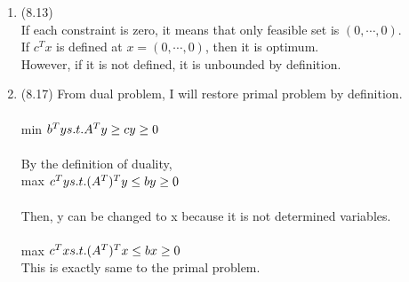 \documentclass[letterpaper,12pt]{article}
\theoremstyle{definition}
\begin{document}
\begin{enumerate}
	\item (8.13) \\
If each constraint is zero, it means that only feasible set is $(0, \cdots, 0)$.\\
If $c^Tx$ is defined at $x = (0, \cdots, 0)$, then it is optimum.\\
However, if it is not defined, it is unbounded by definition.


	\item (8.17) From dual problem, I will restore primal problem by definition.\\ \\
min $ b^Ty\\
s.t. A^Ty \geq c\\
y \geq 0$
\\ \\
By the definition of duality,\\
max $ c^Ty\\
s.t. (A^T)^Ty \leq b\\
y \geq 0
$\\
\\
Then, y can be changed to x because it is not determined variables.\\
\\
max $ c^Tx\\
s.t. (A^T)^Tx \leq b\\
x \geq 0$
\\
This is exactly same to the primal problem. \\ \\ \\ \\ 


\end{enumerate}
\end{document}
